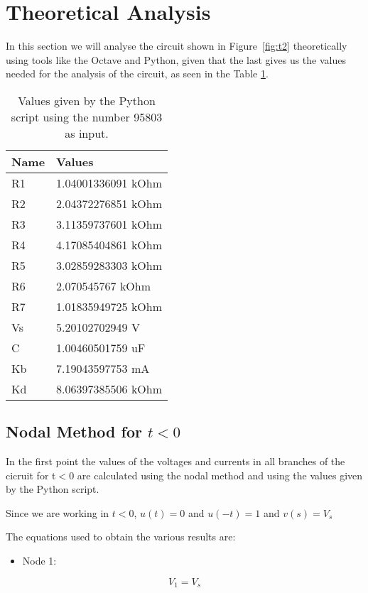 \newpage
{}
\section{Theoretical Analysis}
\label{sec:analysis}


In this section we will analyse the circuit shown in Figure~\ref{fig:t2} theoretically using tools like the Octave and Python, given that the last gives us the values needed for the analysis of the circuit, as seen in the Table \ref{tab:values}.

\begin{table}[ht]
\centering
\begin{tabular}{|l|l|}
\hline
\textbf{Name} & \textbf{Values} \\ \hline
R1 & 1.04001336091 kOhm \\ \hline
R2 & 2.04372276851 kOhm \\ \hline
R3 & 3.11359737601 kOhm \\ \hline
R4 & 4.17085404861 kOhm \\ \hline
R5 & 3.02859283303 kOhm \\ \hline
R6 & 2.070545767 kOhm   \\ \hline
R7 & 1.01835949725 kOhm \\ \hline
Vs & 5.20102702949 V    \\ \hline
C  & 1.00460501759 uF   \\ \hline
Kb & 7.19043597753 mA   \\ \hline
Kd & 8.06397385506 kOhm \\ \hline
\end{tabular}
\caption{Values given by the Python script using the number 95803 as input.}
\label{tab:values}
\end{table}

\subsection{Nodal Method for $t<0$}
\label{subsec:nodal1}
\par
In the first point the values of the voltages and currents in all branches of the cicruit for t$<$0 are calculated using the nodal method and using the values given by the Python script.\par
Since we are working in $t<0$,  $u(t) = 0$ and $u(-t) = 1$ and $v(s) = V_s$

The equations used to obtain the various results are:

\begin{itemize}
    \item Node 1:
\end{itemize}
\begin{equation}
    V_{1} = V_{s}
\end{equation}

